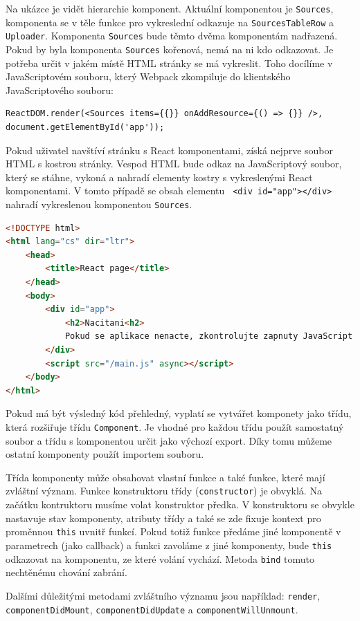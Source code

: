 Na ukázce je vidět hierarchie komponent. Aktuální komponentou je \texttt{Sources}, komponenta se v těle funkce pro vykreslední odkazuje na \texttt{SourcesTableRow} a \texttt{Uploader}. Komponenta \texttt{Sources} bude těmto dvěma komponentám nadřazená. Pokud by byla komponenta \texttt{Sources} kořenová, nemá na ni kdo odkazovat. Je potřeba určit v jakém místě HTML stránky se má vykreslit. Toho docílíme v JavaScriptovém souboru, který Webpack zkompiluje do klientského JavaScriptového souboru:
\begin{lstlisting}[style=JavaScript]
ReactDOM.render(<Sources items={{}} onAddResource={() => {}} />, document.getElementById('app'));
\end{lstlisting}

Pokud uživatel navštíví stránku s React komponentami, získá nejprve soubor HTML s kostrou stránky. Vespod HTML bude odkaz na JavaScriptový soubor, který se stáhne, vykoná a nahradí elementy kostry s vykreslenými React komponentami. V tomto případě se obsah elementu \texttt{ <div id="{}app"{}></div>} nahradí vykreslenou komponentou \texttt{Sources}.
\begin{lstlisting}[language=HTML]
<!DOCTYPE html>
<html lang="cs" dir="ltr">
    <head>
        <title>React page</title>
    </head>
    <body>
        <div id="app">
            <h2>Nacitani<h2>
            Pokud se aplikace nenacte, zkontrolujte zapnuty JavaScript
        </div>
        <script src="/main.js" async></script>
    </body>
</html>
\end{lstlisting}

Pokud má být výsledný kód přehledný, vyplatí se vytvářet komponety jako třídu, která rozšiřuje třídu \texttt{Component}. Je vhodné pro každou třídu použít samostatný soubor a třídu s komponentou určit jako výchozí export. Díky tomu můžeme ostatní komponenty použít importem souboru.

Třída komponenty může obsahovat vlastní funkce a také funkce, které mají zvláštní význam. Funkce konstruktoru třídy (\texttt{constructor}) je obvyklá. Na začátku kontruktoru musíme volat konstruktor předka. V konstruktoru se obvykle nastavuje stav komponenty, atributy třídy a také se zde fixuje kontext pro proměnnou \texttt{this} uvnitř funkcí. Pokud totiž funkce předáme jiné komponentě v parametrech (jako callback) a funkci zavoláme z jiné komponenty, bude \texttt{this} odkazovat na komponentu, ze které volání vychází. Metoda \texttt{bind} tomuto nechtěnému chování zabrání.

Dalšími důležitými metodami zvláštního významu jsou například: \texttt{render}, \texttt{componentDidMount}, \texttt{componentDidUpdate} a \texttt{componentWillUnmount}.

